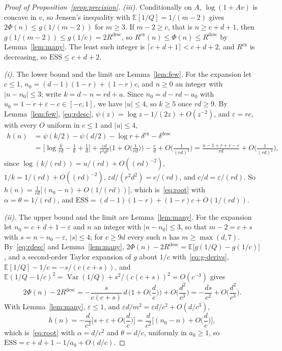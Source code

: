 \documentclass[10pt]{article}
\newcommand{\ess}{\mathrm{ESS}}
\newcommand{\E}{\mathbb{E}}
\begin{document}
\begin{proof}[Proof of Proposition~\ref{prop:precision}]
\emph{(iii).} Conditionally on $A$, $\log(1 + Av)$ is concave in $v$, so Jensen's inequality with $\E[1/Q] = 1/(m-2)$ gives $2\Phi(n) \le g(1/(m-2))$ for $m \ge 3$. If $m - 2 \ge c$, that is $n \ge c + d + 1$, then $g(1/(m-2)) \le g(1/c) = 2R^{\mathrm{desc}}$, so $R^{\mathrm{ex}}(n) \le \Phi(n) \le R^{\mathrm{desc}}$ by Lemma~\ref{lem:many}. The least such integer is $\lceil c + d + 1 \rceil < c + d + 2$, and $R^{\mathrm{ex}}$ is decreasing, so $\ess \le c + d + 2$.

\emph{(i).} The lower bound and the limit are Lemma~\ref{lem:few}. For the expansion let $c \le 1$, $n_0 = (d-1)(1-r) + (1-r)c$, and $n \ge 0$ an integer with $|n - n_0| \le 3$; write $k = d - n = rd + u$. Since $n_0 = d - rd - u_0$ with $u_0 = 1 - r + \varepsilon - c \in [-c, 1]$, we have $|u| \le 4$, so $k \ge 5$ once $rd \ge 9$. By Lemma~\ref{lem:few}, \eqref{eq:rdesc}, $\psi(z) = \log z - 1/(2z) + O(z^{-2})$, and $\varepsilon = rc$, with every $O$ uniform in $c \le 1$ and $|u| \le 4$,
\begin{align*}
h(n) &= \psi(k/2) - \psi(d/2) - \log r + \delta^{\mathrm{ex}} - \delta^{\mathrm{desc}} \\
&= \Big[\log\frac{k}{rd} - \frac1k + \frac1d\Big] + \frac{\varepsilon d}{r^2 d^2}\Big(1 + O\Big(\frac{1}{rd}\Big)\Big) - \frac{c}{d} + O\Big(\frac{1}{(rd)^2}\Big)
 = \frac{u - 1 + r + c - \varepsilon}{rd} + O\Big(\frac{1}{(rd)^2}\Big),
\end{align*}
since $\log(k/(rd)) = u/(rd) + O((rd)^{-2})$, $1/k = 1/(rd) + O((rd)^{-2})$, $\varepsilon d / (r^2 d^2) = c/(rd)$, and $c/d = \varepsilon/(rd)$. So $h(n) = \frac{1}{rd}\big[(n_0 - n) + O(1/(rd))\big]$, which is~\eqref{eq:root} with $\alpha = \theta = 1/(rd)$, and $\ess = (d-1)(1-r) + (1-r)c + O(1/(rd))$.

\emph{(ii).} The upper bound and the limit are Lemma~\ref{lem:many}. For the expansion let $n_0 = c + d + 1 - \varepsilon$ and $n$ an integer with $|n - n_0| \le 3$, so that $m - 2 = c + s$ with $s = n - n_0 - \varepsilon$, $|s| \le 4$; for $c \ge 9d$ every such $n$ has $m \ge \max(d, 7)$. By~\eqref{eq:rdesc} and Lemma~\ref{lem:many}, $2\Phi(n) - 2R^{\mathrm{desc}} = \E\big[g(1/Q) - g(1/c)\big]$, and a second-order Taylor expansion of $g$ about $1/c$ with~\eqref{eq:g-derivs}, $\E[1/Q] - 1/c = -s/(c(c+s))$, and $\E(1/Q - 1/c)^2 = \operatorname{Var}(1/Q) + s^2/(c(c+s))^2 = O(c^{-3})$ gives
\[
2\Phi(n) - 2R^{\mathrm{desc}} = -\frac{s}{c(c+s)}\,d\,\Big(1 + O\Big(\frac dc\Big)\Big) + O\Big(\frac{d^2}{c^3}\Big) = -\frac{ds}{c^2} + O\Big(\frac{d^2}{c^3}\Big).
\]
With Lemma~\ref{lem:many}, $\varepsilon \le 1$, and $\varepsilon d/m^2 = \varepsilon d/c^2 + O(d/c^3)$,
\[
h(n) = -\frac{d}{c^2}\Big[s + \varepsilon + O\Big(\frac{d}{c}\Big)\Big] = \frac{d}{c^2}\Big[(n_0 - n) + O\Big(\frac{d}{c}\Big)\Big],
\]
which is~\eqref{eq:root} with $\alpha = d/c^2$ and $\theta = d/c$, uniformly in $a_0 \ge 1$, so $\ess = c + d + 1 - 1/a_0 + O(d/c)$.
\end{proof}
\end{document}

